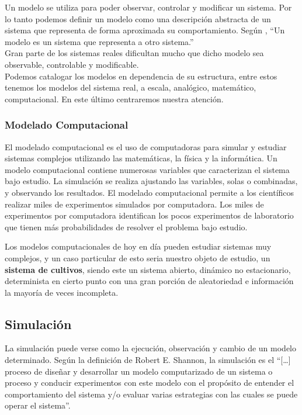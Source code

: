 Un modelo se utiliza para poder observar, controlar y modificar un sistema. Por lo tanto podemos definir un modelo como una descripción abstracta de un sistema que representa de forma aproximada su comportamiento.
Según \parencite{temasdesimulacion}, “Un modelo es un sistema que representa a otro sistema.”\\

Gran parte de los sistemas reales dificultan mucho que dicho modelo sea observable, controlable y modificable.\\

Podemos catalogar los modelos en dependencia de su estructura, entre estos tenemos los modelos del sistema real, a escala, analógico, matemático, computacional. En este último centraremos nuestra atención.\\

\subsubsection{Modelado Computacional}
El modelado computacional es el uso de computadoras para simular y estudiar sistemas complejos utilizando las matemáticas, la física y la informática. Un modelo computacional contiene numerosas variables que caracterizan el sistema bajo estudio. La simulación se realiza ajustando las variables, solas o combinadas, y observando los resultados. El modelado computacional permite a los científicos realizar miles de experimentos simulados por computadora. Los miles de experimentos por computadora identifican los pocos experimentos de laboratorio que tienen más probabilidades de resolver el problema bajo estudio. \parencite{noauthor_modelado_nodate}

Los modelos computacionales de hoy en día pueden estudiar sistemas muy complejos, y un caso particular de esto seria nuestro objeto de estudio, un \textbf{sistema de cultivos}, siendo este un sistema abierto, dinámico no estacionario, determinista en cierto punto con una gran porción de aleatoriedad e información la mayoría de veces incompleta. \\

\subsection{Simulación}
La simulación puede verse como la ejecución, observación y cambio de un modelo determinado.
Según la definición de Robert E. Shannon, \parencite{shannon1975simulacion} la simulación es el “[…] proceso de diseñar y desarrollar un modelo computarizado de un sistema o proceso y conducir experimentos con este modelo con el propósito de entender el comportamiento del sistema y/o evaluar varias estrategias con las cuales se puede operar el sistema”.\\

